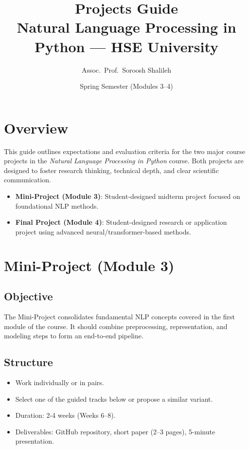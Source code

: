 \documentclass[12pt]{article}
\title{\textbf{Projects Guide}\\[0.5em]
Natural Language Processing in Python --- HSE University}
\author{Assoc.\ Prof.\ Soroosh Shalileh}
\date{Spring Semester (Modules 3--4)}
\begin{document}
\maketitle

\section*{Overview}
This guide outlines expectations and evaluation criteria for the two major course projects in the \emph{Natural Language Processing in Python} course. Both projects are designed to foster research thinking, technical depth, and clear scientific communication.

\begin{itemize}[leftmargin=*]
  \item \textbf{Mini-Project (Module 3)}: Student-designed midterm project focused on foundational NLP methods.
  \item \textbf{Final Project (Module 4)}: Student-designed research or application project using advanced neural/transformer-based methods.
\end{itemize}

\section{Mini-Project (Module 3)}
\subsection*{Objective}
The Mini-Project consolidates fundamental NLP concepts covered in the first module of the course. It should combine preprocessing, representation, and modeling steps to form an end-to-end pipeline.

\subsection*{Structure}
\begin{itemize}[leftmargin=*]
  \item Work individually or in pairs.
  \item Select one of the guided tracks below or propose a similar variant.
  \item Duration: 2-4 weeks (Weeks 6--8).
  \item Deliverables: GitHub repository, short paper (2--3 pages), 5-minute presentation.
\end{itemize}
\end{document}
